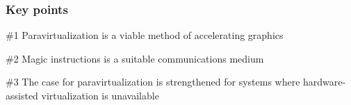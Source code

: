 \begin{frame}
\frametitle{Key points}

\begin{block}{\#1}
	Paravirtualization is a viable method of accelerating graphics
\end{block}

\begin{block}{\#2}
	Magic instructions is a suitable communications medium
\end{block}

\begin{block}{\#3}
	The case for paravirtualization is strengthened for systems where hardware-assisted virtualization is unavailable
\end{block}

\end{frame}
